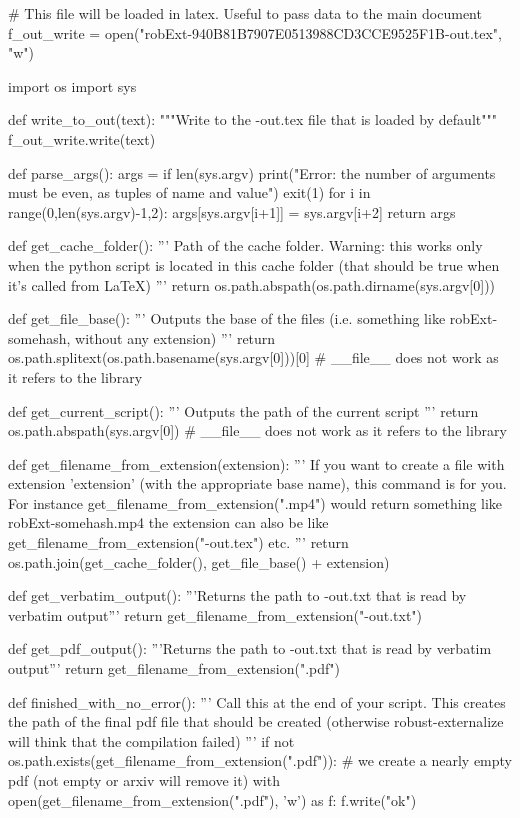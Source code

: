 
# This file will be loaded in latex. Useful to pass data to the main document
f_out_write = open("robExt-940B81B7907E0513988CD3CCE9525F1B-out.tex", "w")

import os
import sys

def write_to_out(text):
    """Write to the -out.tex file that is loaded by default"""
    f_out_write.write(text)

def parse_args():
    args = {}
    if len(sys.argv) %
        print("Error: the number of arguments must be even, as tuples of name and value")
        exit(1)
    for i in range(0,len(sys.argv)-1,2):
        args[sys.argv[i+1]] = sys.argv[i+2]
    return args

def get_cache_folder():
    '''
    Path of the cache folder. Warning: this works only when the python script
    is located in this cache folder (that should be true when it's called from LaTeX)
    '''
    return os.path.abspath(os.path.dirname(sys.argv[0]))

def get_file_base():
    '''
    Outputs the base of the files (i.e. something like robExt-somehash, without any extension)
    '''
    return os.path.splitext(os.path.basename(sys.argv[0]))[0] # __file__ does not work as it refers to the library

def get_current_script():
    '''
    Outputs the path of the current script
    '''
    return os.path.abspath(sys.argv[0]) # __file__ does not work as it refers to the library


def get_filename_from_extension(extension):
    '''
    If you want to create a file with extension 'extension' (with the appropriate base name), this command
    is for you. For instance get_filename_from_extension(".mp4") would return something like
    robExt-somehash.mp4
    the extension can also be like get_filename_from_extension("-out.tex") etc.
    '''
    return os.path.join(get_cache_folder(), get_file_base() + extension)

def get_verbatim_output():
    '''Returns the path to -out.txt that is read by verbatim output'''
    return get_filename_from_extension("-out.txt")

def get_pdf_output():
    '''Returns the path to -out.txt that is read by verbatim output'''
    return get_filename_from_extension(".pdf")


def finished_with_no_error():
    '''
    Call this at the end of your script. This creates the path of the final pdf file that should be
    created (otherwise robust-externalize will think that the compilation failed)
    '''
    if not os.path.exists(get_filename_from_extension(".pdf")):
        # we create a nearly empty pdf (not empty or arxiv will remove it)
        with open(get_filename_from_extension(".pdf"), 'w') as f:
            f.write("ok")

